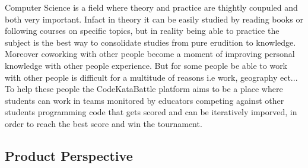 Computer Science is a field where theory and practice are thightly coupuled and both very important.
Infact in theory it can be easily studied by reading books or following courses on specific topics, but in reality being able to practice the subject is the best way to consolidate studies from pure erudition to knowledge.
Moreover coworking with other people become a moment of improving personal knowledge with other people experience.
But for some people be able to work with other people is difficult for a multitude of reasons i.e work, geography ect... 
To help these people the CodeKataBattle platform aims to be a place where students can work in teams monitored by educators competing against other students programming code that gets scored and can be iteratively imporved, in order to reach the best score and win the tournament.
\subsection{Product Perspective}
